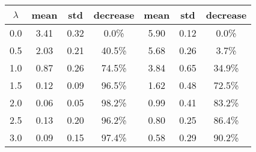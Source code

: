 \begin{tabular}{c||c|c|c||c|c|c}
\toprule
 $\lambda$ &  mean &  std & decrease &  mean &  std & decrease \\
\midrule
       0.0 &  3.41 & 0.32 &    0.0\% &  5.90 & 0.12 &    0.0\% \\
       0.5 &  2.03 & 0.21 &   40.5\% &  5.68 & 0.26 &    3.7\% \\
       1.0 &  0.87 & 0.26 &   74.5\% &  3.84 & 0.65 &   34.9\% \\
       1.5 &  0.12 & 0.09 &   96.5\% &  1.62 & 0.48 &   72.5\% \\
       2.0 &  0.06 & 0.05 &   98.2\% &  0.99 & 0.41 &   83.2\% \\
       2.5 &  0.13 & 0.20 &   96.2\% &  0.80 & 0.25 &   86.4\% \\
       3.0 &  0.09 & 0.15 &   97.4\% &  0.58 & 0.29 &   90.2\% \\
\bottomrule
\end{tabular}
